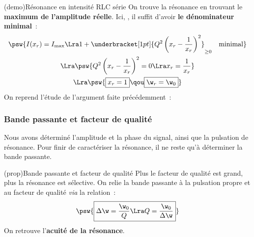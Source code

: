\documentclass[../../main/main.tex]{subfiles}
\begin{document}
\begin{tcb*}[breakable](demo){Résonance en intensité RLC série}
	On trouve la résonance en trouvant le \textbf{maximum de l'amplitude réelle}.
	\smallbreak
	Ici, , il suffit d'avoir
	\textbf{le dénominateur minimal}~:
	\begin{gather*}
		\psw{%
			I(x_r) = I_{\max}
			\Lra
			1 + \underbracket[1pt]{Q^2\left( x_r - \frac{1}{x_r} \right)^2}_{\geq 0}
			\quad \text{minimal}
		}%
		\\\Lra
		\psw{%
			Q^2\left( x_r - \frac{1}{x_r} \right)^2 = 0
			\Lra
			x_r = \frac{1}{x_r}
		}%
		\\\Lra
		\psw{%
			\boxed{x_r = 1}
			\qou
			\boxed{\w_r = \w_0}
		}%
	\end{gather*}
	\vspace{-15pt}
	\tcblower
	On reprend l'étude de l'argument faite précédemment~:
	\psw{%
	\[
		\tan(\f_i(x_r)) = - Q \pa{x_r - \frac{1}{x_r}} = 0
		\Lra
		\boxed{\f_i(x_r) = 0}
		\qcr
		\f_i \in \left] -\frac{\pi}{2}\,; \frac{\pi}{2} \right[
	\]
	}%
	\vspace{-15pt}
\end{tcb*}

\subsubsection{Bande passante et facteur de qualité}
Nous avons déterminé l'amplitude et la phase du signal, ainsi que la
pulsation de résonance. Pour finir de caractériser la résonance, il ne reste
qu'à déterminer la bande passante.

\begin{tcb*}(prop){Bande passante et facteur de qualité}
	Plus le facteur de qualité est grand, plus la résonance est sélective. On
	relie la bande passante à la pulsation propre et au facteur de qualité
	\textit{via} la relation~:
	\[
		\psw{%
			\boxed{%
				\Delta{\w} = \frac{\w_0}{Q}
				\Lra
				Q = \frac{\w_0}{\Delta{\w}}
			}
		}%
	\]
	On retrouve l'\textbf{acuité de la résonance}.
\end{tcb*}
\end{document}

